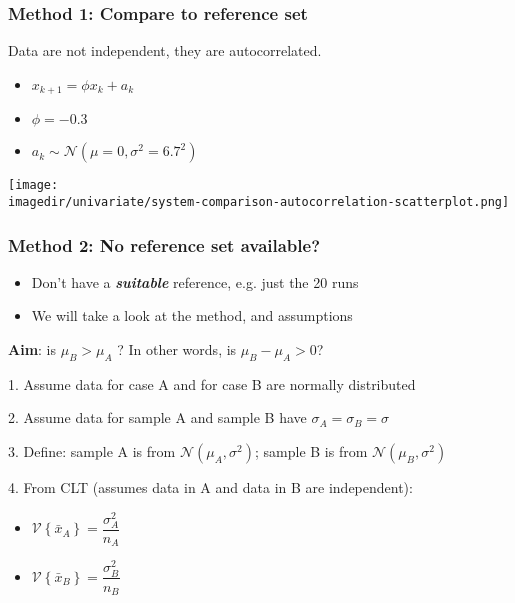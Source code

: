 \begin{frame}\frametitle{Method 1: Compare to reference set}

	Data are not independent, they are autocorrelated.
	\begin{itemize}
		\item	$x_{k+1} = \phi x_{k} + a_k$
		\item	$\phi = -0.3$
		\item	$a_k \sim \mathcal{N}\left(\mu=0, \sigma^2=6.7^2\right)$
	\end{itemize}
	\begin{center}
		\texttt{[image: \\imagedir/univariate/system-comparison-autocorrelation-scatterplot.png]}
	\end{center}
\end{frame}

\begin{frame}\frametitle{Method 2: No reference set available?}
	\begin{itemize}
		\item	Don't have a \textbf{\emph{suitable}} reference, e.g. just the 20 runs
		\item	We will take a look at the method, and assumptions
	\end{itemize}

	\textbf{Aim}: is $\mu_B > \mu_A$ ? In other words, is $\mu_B - \mu_A > 0$?

	1. Assume data for case A and for case B are normally distributed

	2. Assume data for sample A and sample B have $\sigma_A = \sigma_B = \sigma$

	3. Define: sample A is from $\mathcal{N}\left(\mu_A, \sigma^2\right)$; sample B is from $\mathcal{N}\left(\mu_B, \sigma^2\right)$

	4. From CLT (assumes data in A and data in B are independent):
	\begin{itemize}
		\item	$\mathcal{V}\left\{\bar{x}_A\right\} = \dfrac{\sigma^2_A}{n_A}$
		\item	$\mathcal{V}\left\{\bar{x}_B\right\} = \dfrac{\sigma^2_B}{n_B}$
	\end{itemize}
\end{frame}

